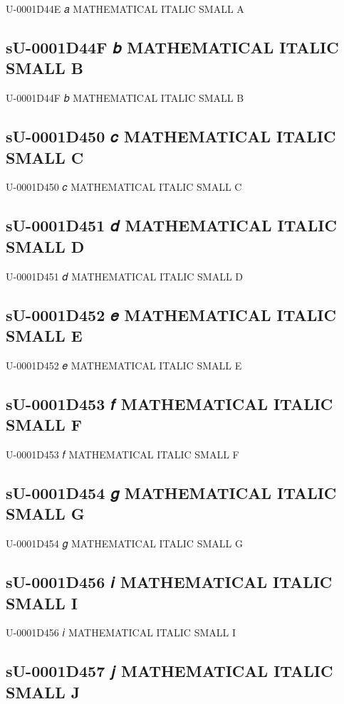 U-0001D44E 𝑎 MATHEMATICAL ITALIC SMALL A

\subsection{sU-0001D44F 𝑏 MATHEMATICAL ITALIC SMALL B}

U-0001D44F 𝑏 MATHEMATICAL ITALIC SMALL B

\subsection{sU-0001D450 𝑐 MATHEMATICAL ITALIC SMALL C}

U-0001D450 𝑐 MATHEMATICAL ITALIC SMALL C

\subsection{sU-0001D451 𝑑 MATHEMATICAL ITALIC SMALL D}

U-0001D451 𝑑 MATHEMATICAL ITALIC SMALL D

\subsection{sU-0001D452 𝑒 MATHEMATICAL ITALIC SMALL E}

U-0001D452 𝑒 MATHEMATICAL ITALIC SMALL E

\subsection{sU-0001D453 𝑓 MATHEMATICAL ITALIC SMALL F}

U-0001D453 𝑓 MATHEMATICAL ITALIC SMALL F

\subsection{sU-0001D454 𝑔 MATHEMATICAL ITALIC SMALL G}

U-0001D454 𝑔 MATHEMATICAL ITALIC SMALL G

\subsection{sU-0001D456 𝑖 MATHEMATICAL ITALIC SMALL I}

U-0001D456 𝑖 MATHEMATICAL ITALIC SMALL I

\subsection{sU-0001D457 𝑗 MATHEMATICAL ITALIC SMALL J}

